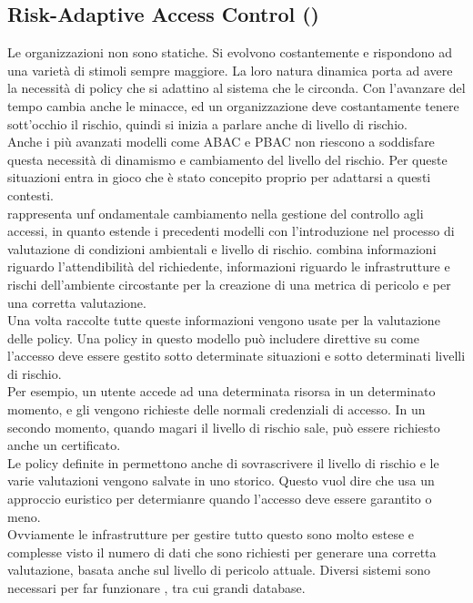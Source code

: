 \subsection*{Risk-Adaptive Access Control (\radac)} %
\label{sub:risk_adaptive_access_control_}

Le organizzazioni non sono statiche. Si evolvono costantemente e rispondono ad una varietà di stimoli sempre maggiore. La loro natura dinamica porta ad avere la necessità di policy che si adattino al sistema che le circonda. Con l'avanzare del tempo cambia anche le minacce, ed un organizzazione deve costantamente tenere sott'occhio il rischio, quindi si inizia a parlare anche di livello di rischio.\\
Anche i più avanzati modelli come ABAC e PBAC non riescono a soddisfare questa necessità di dinamismo e cambiamento del livello del rischio. Per queste situazioni entra in gioco \radac che è stato concepito proprio per adattarsi a questi contesti.\\
\radac rappresenta unf ondamentale cambiamento nella gestione del controllo agli accessi, in quanto estende i precedenti modelli con l'introduzione nel processo di valutazione di condizioni ambientali e livello di rischio.
\radac combina informazioni riguardo l'attendibilità del richiedente, informazioni riguardo le infrastrutture e rischi dell'ambiente circostante per la creazione di una metrica di pericolo e per una corretta valutazione.\\
Una volta raccolte tutte queste informazioni vengono usate per la valutazione delle policy. Una policy in questo modello può includere direttive su come l'accesso deve essere gestito sotto determinate situazioni e sotto determinati livelli di rischio.\\
Per esempio, un utente accede ad una determinata risorsa in un determinato momento, e gli vengono richieste delle normali credenziali di accesso. In un secondo momento, quando magari il livello di rischio sale, può essere richiesto anche un certificato.\\
Le policy definite in \radac permettono anche di sovrascrivere il livello di rischio e le varie valutazioni vengono salvate in uno storico.
Questo vuol dire che \radac usa un approccio euristico per determianre quando l'accesso deve essere garantito o meno.\\
Ovviamente le infrastrutture per gestire tutto questo sono molto estese e complesse visto il numero di dati che sono richiesti per generare una corretta valutazione, basata anche sul livello di pericolo attuale. Diversi sistemi sono necessari per far funzionare \radac, tra cui grandi database.\\
